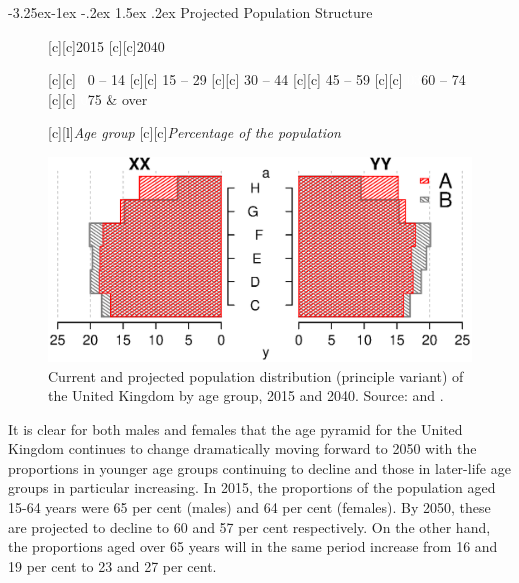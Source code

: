 \documentclass[11 pt, a4paper]{report}
\makeatletter
\renewcommand\subsection{\@startsection{subsection}{2}{\z@}%
                                     {-3.25ex\@plus -1ex \@minus -.2ex}%
                                     {1.5ex \@plus .2ex}%
    								{\large\scshape}}
\makeatother
\begin{document}
\subsection{Projected Population Structure}
\begin{figure}[hbtp!]

[c][c]{2015}
[c][c]{2040}

[c][c]{\scriptsize{ \textcolor{white}{0}0 -- 14}}
[c][c]{\scriptsize{ 15 -- 29}}
[c][c]{\scriptsize{ 30 -- 44}}
[c][c]{\scriptsize{ 45 -- 59}}
[c][c]{\scriptsize{ \textcolor{white}{03}60 -- 74}}
[c][c]{\scriptsize{ \textcolor{white}{0}75 \& over}}

[c][l]{\small{\emph{Age group}}}
[c][c]{\small{\emph{Percentage of the population}}}

\includegraphics[width=\textwidth]{../figures/Fig1.5.eps}
\caption{Current and projected population distribution (principle variant) of the United Kingdom by age group, 2015 and 2040. Source: \citet{ONS2013b} and  \citet{HMD2015}.}\label{Fig:05.5}
\end{figure}

It is clear for both males and females that the age pyramid for the United Kingdom continues to change dramatically moving forward to 2050 with the proportions in younger age groups continuing to decline and those in later-life age groups in particular increasing. In 2015, the proportions of the population aged 15-64 years were 65 per cent (males) and 64 per cent (females). By 2050, these are projected to  decline to 60 and 57 per cent respectively. On the other hand, the proportions aged over 65 years will in the same period increase from 16 and 19 per cent to 23 and 27 per cent.
\end{document}
